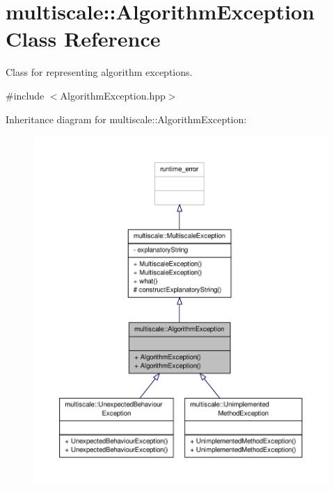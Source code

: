 \hypertarget{classmultiscale_1_1AlgorithmException}{\section{multiscale\-:\-:Algorithm\-Exception Class Reference}
\label{classmultiscale_1_1AlgorithmException}
}


Class for representing algorithm exceptions.  




{\ttfamily \#include $<$Algorithm\-Exception.\-hpp$>$}



Inheritance diagram for multiscale\-:\-:Algorithm\-Exception\-:
\nopagebreak
\begin{figure}[H]
\begin{center}
\leavevmode
\includegraphics[width=350pt]{classmultiscale_1_1AlgorithmException__inherit__graph}
\end{center}
\end{figure}


